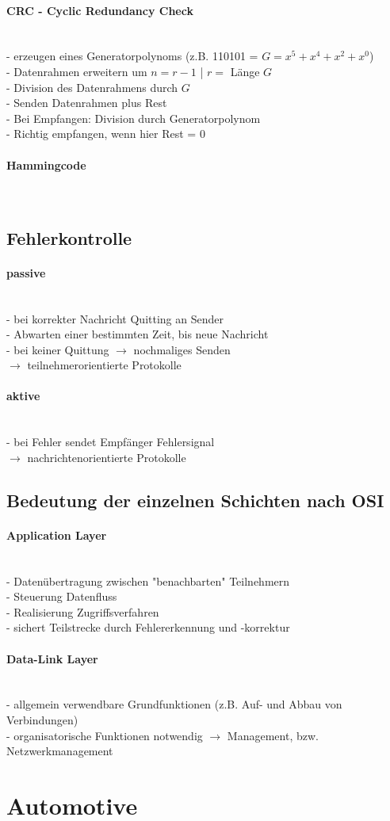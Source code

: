\documentclass{article}
\newcommand{\myparagraph}[1]{\paragraph{#1}\mbox{}\\}
\newcommand{\follows}{$\rightarrow$ }
\begin{document}
	\myparagraph{CRC - Cyclic Redundancy Check}
	- erzeugen eines Generatorpolynoms (z.B. 110101 = $G = x^5 + x^4 + x^2 + x^0$) \\
	- Datenrahmen erweitern um $n = r - 1$ | $r =$ Länge $G$ \\
	- Division des Datenrahmens durch $G$ \\
	- Senden Datenrahmen plus Rest \\
	- Bei Empfangen: Division durch Generatorpolynom \\
	- Richtig empfangen, wenn hier Rest = 0
	
	\myparagraph{Hammingcode}
	
	\subsection{Fehlerkontrolle}
	\myparagraph{passive}
	- bei korrekter Nachricht Quitting an Sender \\
	- Abwarten einer bestimmten Zeit, bis neue Nachricht \\
	- bei keiner Quittung \follows nochmaliges Senden \\
	\follows teilnehmerorientierte Protokolle
	
	\myparagraph{aktive}
	- bei Fehler sendet Empfänger Fehlersignal \\
	\follows nachrichtenorientierte Protokolle
	
	\subsection{Bedeutung der einzelnen Schichten nach OSI}
	\myparagraph{Application Layer}
	- Datenübertragung zwischen "benachbarten" Teilnehmern \\
	- Steuerung Datenfluss \\
	- Realisierung Zugriffsverfahren \\
	- sichert Teilstrecke durch Fehlererkennung und -korrektur
	
	\myparagraph{Data-Link Layer}
	- allgemein verwendbare Grundfunktionen (z.B. Auf- und Abbau von Verbindungen) \\
	- organisatorische Funktionen notwendig \follows Management, bzw. Netzwerkmanagement
	
	\section{Automotive}
\end{document}
